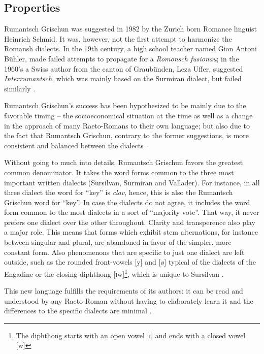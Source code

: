 \subsection{Properties}
Rumantsch Grischun was suggested in 1982 by the Zurich born Romance linguist Heinrich Schmid. 
It was, however, not the first attempt to harmonize the Romansh dialects. 
In the 19th century, a high school teacher named Gion Antoni Bühler, made failed attempts to propagate for a \emph{Romonsch fusionau}; in the 1960's a Swiss author from the canton of Graubünden, Leza Uffer, suggested \emph{Interrumantsch}, which was mainly based on the Surmiran dialect, but failed similarly \cite[39]{liver1999}.

Rumantsch Grischun's success has been hypothesized to be mainly due to the favorable timing -- the socioeconomical situation at the time as well as a change in the approach of many Raeto-Romans to their own language; but also due to the fact that Rumantsch Grischun, contrary to the former suggestions, is more consistent and balanced between the dialects \autocite[69]{liver1999}.

Without going to much into details, Rumantsch Grischun favors the greatest common denominator. 
It takes the word forms common to the three most important written dialects (Sursilvan, Surmiran and Vallader). For instance, in all three dialect the word for \enquote{key} is \emph{clav}, hence, this is also the Rumantsch Grischun word for \enquote{key}.
In case the dialects do not agree, it includes the word form common to the most dialects in a sort of \enquote{majority vote}. 
That way, it never prefers one dialect over the other throughout. 
Clarity and transperence also play a major role. 
This means that forms which exhibit stem alternations, for instance between singular and plural, are abandoned in favor of the simpler, more constant form.
Also phenomenons that are specific to just one dialect are left outside, such as the rounded front-vowels [y] and [ø] typical of the dialects of the Engadine or the closing diphthong [ɪw]\footnote{The diphthong starts with an open vowel [ɪ] and ends with a closed vowel [w]}, which is unique to Sursilvan \autocite[70]{liver1999}.

This new language fulfills the requirements of its authors: it can be read and understood by any Raeto-Roman without having to elaborately learn it and the differences to the specific dialects are minimal \autocite[72]{liver1999}. 


